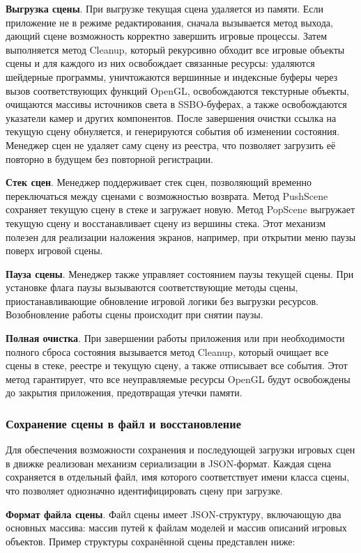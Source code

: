 \textbf{Выгрузка сцены}. При выгрузке текущая сцена удаляется из памяти. Если приложение не в режиме редактирования, сначала вызывается метод выхода, дающий сцене возможность корректно завершить игровые процессы. Затем выполняется метод Cleanup, который рекурсивно обходит все игровые объекты сцены и для каждого из них освобождает связанные ресурсы: удаляются шейдерные программы, уничтожаются вершинные и индексные буферы через вызов соответствующих функций OpenGL, освобождаются текстурные объекты, очищаются массивы источников света в SSBO-буферах, а также освобождаются указатели камер и других компонентов. После завершения очистки ссылка на текущую сцену обнуляется, и генерируются события об изменении состояния. Менеджер сцен не удаляет саму сцену из реестра, что позволяет загрузить её повторно в будущем без повторной регистрации.

\textbf{Стек сцен}. Менеджер поддерживает стек сцен, позволяющий временно переключаться между сценами с возможностью возврата. Метод PushScene сохраняет текущую сцену в стеке и загружает новую. Метод PopScene выгружает текущую сцену и восстанавливает сцену из вершины стека. Этот механизм полезен для реализации наложения экранов, например, при открытии меню паузы поверх игровой сцены.

\textbf{Пауза сцены}. Менеджер также управляет состоянием паузы текущей сцены. При установке флага паузы вызываются соответствующие методы сцены, приостанавливающие обновление игровой логики без выгрузки ресурсов. Возобновление работы сцены происходит при снятии паузы.

\textbf{Полная очистка}. При завершении работы приложения или при необходимости полного сброса состояния вызывается метод Cleanup, который очищает все сцены в стеке, реестре и текущую сцену, а также отписывает все события. Этот метод гарантирует, что все неуправляемые ресурсы OpenGL будут освобождены до закрытия приложения, предотвращая утечки памяти.

\subsubsection{Сохранение сцены в файл и восстановление}
Для обеспечения возможности сохранения и последующей загрузки игровых сцен в движке реализован механизм сериализации в JSON-формат. Каждая сцена сохраняется в отдельный файл, имя которого соответствует имени класса сцены, что позволяет однозначно идентифицировать сцену при загрузке.

\textbf{Формат файла сцены}. Файл сцены имеет JSON-структуру, включающую два основных массива: массив путей к файлам моделей и массив описаний игровых объектов. Пример структуры сохранённой сцены представлен ниже: \\ \\

